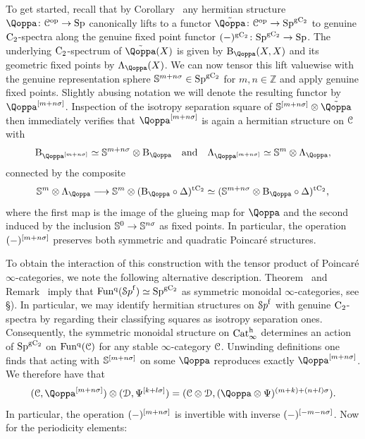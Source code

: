 To get started, %
recall that by Corollary~ any hermitian structure $\QF \colon \C\op \rightarrow \Sp$ canonically lifts to a functor $\tilde\QF\colon \C\op \to \Sp^{\g\Ct}$ to genuine $\mathrm{C_2}$-spectra along the genuine fixed point functor $(-)^{\mathrm{g}\mathrm{C_2}} \colon \mathrm{Sp}^{\mathrm{g}\mathrm{C_2}} \rightarrow \mathrm{Sp}$. The underlying $\mathrm{C_2}$-spectrum of $\tilde \QF(X)$ is given by $\Bil_\QF(X,X)$ and its geometric fixed points by $\Lambda_\QF(X)$. We can now tensor this lift valuewise with the genuine representation sphere $\mathbb{S}^{m+n\sigma} \in \mathrm{Sp}^{\mathrm{g}\mathrm{C_2}}$ for $m,n \in \mathbb Z$ and apply genuine fixed points. Slightly abusing notation we will denote the resulting functor by $\QF\qshift{m+n\sigma}$. Inspection of the isotropy separation square of $\mathbb S^{[m+n\sigma]} \otimes \tilde\QF$ then immediately verifies that $\QF\qshift{m+n\sigma}$ is again a hermitian structure on $\mathcal C$ with
\[
\Bil_{\QF\qshift{m+n\sigma}} \simeq \SS^{m+n\sigma} \otimes \Bil_\QF \quad \text{and} \quad \Lambda_{\QF\qshift{m+n\sigma}} \simeq \mathbb S^m \otimes \Lambda_\QF,
\]
connected by the composite
\[
\SS^m \otimes \Lambda_\QF \longrightarrow \SS^m \otimes (\Bil_\QF \circ \Delta)^\tC \simeq (\SS^{m+n\sigma} \otimes \Bil_\QF \circ \Delta)^\tC,
\]
where the first map is the image of the glueing map for $\QF$ and the second induced by the inclusion $\mathbb{S}^0 \rightarrow \mathbb{S}^{n\sigma}$ as fixed points. In particular, the operation $(-)^{[m+n\sigma]}$ preserves both symmetric and quadratic Poincaré structures.

To obtain the interaction of this construction with the tensor product of Poincaré $\infty$-categories, we note the following alternative description. Theorem~ and Remark~ imply that $\operatorname{Fun^q}({\mathcal Sp}^{\mathrm{f}}) \simeq \mathrm{Sp}^{\mathrm{g}\mathrm{C_2}}$ as symmetric monoidal $\infty$-categories, see \S{}). In particular, we may identify hermitian structures on ${\mathcal Sp}^{\mathrm{f}}$ with genuine $\mathrm{C_2}$-spectra by regarding their classifying squares as %
isotropy separation ones. Consequently, the symmetric monoidal structure on $\mathrm{Cat}^\mathrm{h}_\infty$ determines an action of $\mathrm{Sp}^{\mathrm{g}\mathrm{C_2}}$ on $\operatorname{Fun^q}(\mathcal C)$ for any stable $\infty$-category $\mathcal C$. Unwinding definitions one finds that acting with $\mathbb S^{[m+n\sigma]}$ on some $\QF$ reproduces exactly $\QF\qshift{m+n\sigma}$. %
We therefore have that
\[
(\C,\QF\qshift{m+n\sigma}) \otimes (\D,\Psi\qshift{k+l\sigma}) = (\C \otimes \D,(\QF \otimes \Psi)^{(m+k)+(n+l)\sigma}).
\]
In particular, the operation $(-)^{[m+n\sigma]}$ is invertible with inverse $(-)^{[-m-n\sigma]}$.  %
Now for the periodicity elements:


